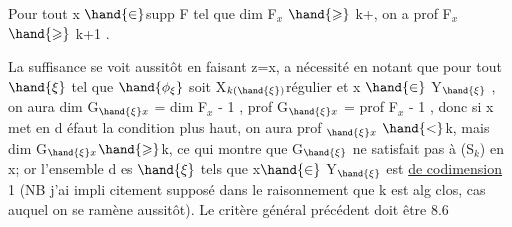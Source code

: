  Pour tout  x $\hand{\in}$supp F tel que dim F$_x$ $\hand{\geqslant}$ k+, on a prof F$_x$ $\hand{\geqslant}$ k+1 .

La suffisance se voit aussitôt en faisant z=x, a nécessité   en
notant que pour tout $\hand{\xi}$ tel que $\hand{\phi_\xi}$ soit X$_{k(\hand{\xi})}$\hand{\unsure{$-$|$+$}}régulier et x $\hand{\in}$ Y$_{\hand{\xi}}$ ,
on aura dim G$_{\hand{\xi} x}$ = dim F$_x$ - 1 , prof G$_{\hand{\xi} x}$ = prof F$_x$ - 1 , donc si
x met en d éfaut la condition plus haut, on aura prof $_{\hand{\xi} x}$ $\hand{<}$k, mais
dim G$_{\hand{\xi} x}$$\hand{\geqslant}$k, ce qui montre que G$_{\hand{\xi}}$ ne satisfait pas à (S$_k$) en x; or
l'ensemble d es $\hand{\xi}$ tels que x$\hand{\in}$ Y$_{\hand{\xi}}$ est \uline{de codimension} 1 (NB j'ai impli
 citement supposé dans le raisonnement que k est alg clos, cas auquel on
se ramène aussitôt). Le critère général précédent doit être   8.6
